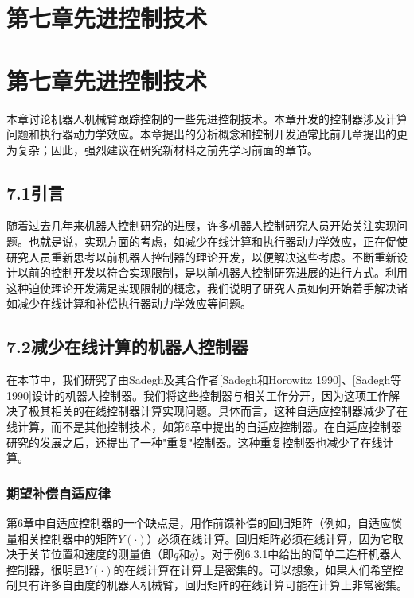 \documentclass[UTF8]{ctexart}
\begin{document}
  \section*{第七章\quad 先进控制技术}
\fi

\ifstandalone
\else
  \section*{第七章\quad 先进控制技术}
\fi

本章讨论机器人机械臂跟踪控制的一些先进控制技术。本章开发的控制器涉及计算问题和执行器动力学效应。本章提出的分析概念和控制开发通常比前几章提出的更为复杂；因此，强烈建议在研究新材料之前先学习前面的章节。

\subsection*{7.1\quad 引言}

随着过去几年来机器人控制研究的进展，许多机器人控制研究人员开始关注实现问题。也就是说，实现方面的考虑，如减少在线计算和执行器动力学效应，正在促使研究人员重新思考以前机器人控制器的理论开发，以便解决这些考虑。不断重新设计以前的控制开发以符合实现限制，是以前机器人控制研究进展的进行方式。利用这种迫使理论开发满足实现限制的概念，我们说明了研究人员如何开始着手解决诸如减少在线计算和补偿执行器动力学效应等问题。

\subsection*{7.2\quad 减少在线计算的机器人控制器}

在本节中，我们研究了由Sadegh及其合作者[Sadegh和Horowitz 1990]、[Sadegh等1990]设计的机器人控制器。我们将这些控制器与相关工作分开，因为这项工作解决了极其相关的在线控制器计算实现问题。具体而言，这种自适应控制器减少了在线计算，而不是其他控制技术，如第6章中提出的自适应控制器。在自适应控制器研究的发展之后，还提出了一种"重复"控制器。这种重复控制器也减少了在线计算。

\subsubsection*{期望补偿自适应律}

第6章中自适应控制器的一个缺点是，用作前馈补偿的回归矩阵（例如，自适应惯量相关控制器中的矩阵$Y(\cdot)$）必须在线计算。回归矩阵必须在线计算，因为它取决于关节位置和速度的测量值（即$q$和$\dot{q}$）。对于例6.3.1中给出的简单二连杆机器人控制器，很明显$Y(\cdot)$的在线计算在计算上是密集的。可以想象，如果人们希望控制具有许多自由度的机器人机械臂，回归矩阵的在线计算可能在计算上非常密集。
\end{document}
